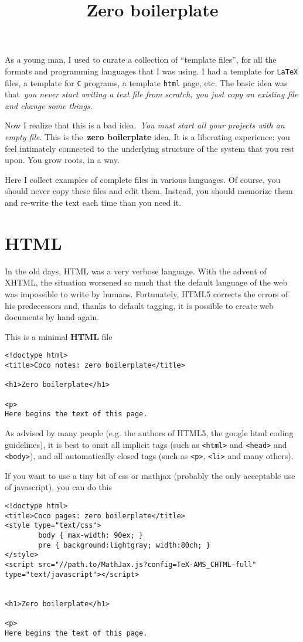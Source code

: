 \title{Zero boilerplate}

As a young man, I used to curate a collection of ``template files'', for all
the formats and programming languages that I was using.  I had a template for
\verb+LaTeX+ files, a template for \verb+C+ programs, a template \verb+html+
page, etc.  The basic idea was that~\emph{you never start writing a text file
from scratch, you just copy an existing file and change some things}.

Now I realize that this is a bad idea.~\emph{You must start all your projects
with an empty file}.  This is the~{\bf zero boilerplate} idea.  It is a
liberating experience; you feel intimately connected to the underlying
structure of the system that you rest upon.  You grow roots, in a way.

Here I collect examples of complete files in various languages.  Of course,
you should never copy these files and edit them.  Instead, you should
memorize them and re-write the text each time than you need it.

\section{HTML}

In the old days, HTML was a very verbose language.  With the advent of XHTML,
the situation worsened so much that the default language of the web was
impossible to write by humans.  Fortunately, HTML5 corrects the errors of his
predecessors and, thanks to default tagging, it is possible to create web
documents by hand again.

This is a minimal {\bf HTML} file
\begin{verbatim}
<!doctype html>
<title>Coco notes: zero boilerplate</title>

<h1>Zero boilerplate</h1>

<p>
Here begins the text of this page.
\end{verbatim}

As advised by many people (e.g. the authors of HTML5, the google html coding
guidelines), it is best to omit all implicit tags (such as \verb+<html>+ and
\verb+<head>+ and \verb+<body>+), and all automatically closed tags (such as
\verb+<p>+, \verb+<li>+ and many others).

If you want to use a tiny bit of css or mathjax (probably the only acceptable
use of javascript), you can do this
\begin{verbatim}
<!doctype html>
<title>Coco pages: zero boilerplate</title>
<style type="text/css">
        body { max-width: 90ex; }
        pre { background:lightgray; width:80ch; }
</style>
<script src="//path.to/MathJax.js?config=TeX-AMS_CHTML-full" type="text/javascript"></script>


<h1>Zero boilerplate</h1>

<p>
Here begins the text of this page.
\end{verbatim}

